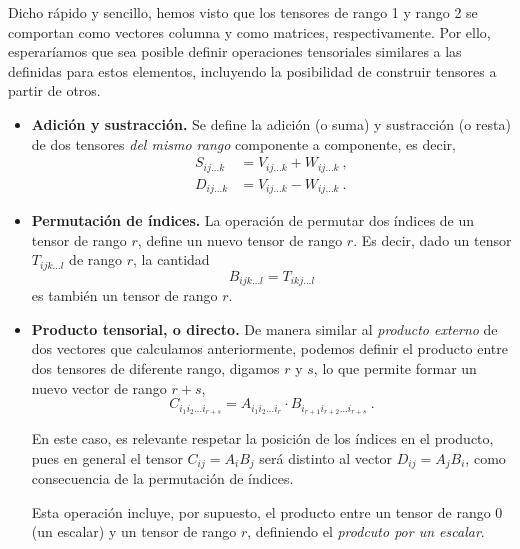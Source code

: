Dicho rápido y sencillo, hemos visto que los tensores de rango 1 y rango 2 se comportan como vectores columna y como matrices, respectivamente. Por ello, esperaríamos que sea posible definir operaciones tensoriales similares a las definidas para estos elementos, incluyendo la posibilidad de construir tensores a partir de otros.

\begin{itemize}
    \item \textbf{Adición y sustracción.} Se define la adición (o suma) y sustracción (o resta) de dos tensores \emph{del mismo rango} componente a componente, es decir,
    \begin{align}
        S_{ij \dots k} & = V_{ij \dots k} + W_{ij \dots k} \ , \\
        D_{ij \dots k} & = V_{ij \dots k} - W_{ij \dots k} \ .
    \end{align}
    \item \textbf{Permutación de índices.} La operación de permutar dos índices de un tensor de rango $r$, define un nuevo tensor de rango $r$. Es decir, dado un tensor $T_{ijk \dots l}$ de rango $r$, la cantidad
    \begin{equation}
        B_{ijk \dots l} = T_{ikj \dots l} 
    \end{equation}
    es también un tensor de rango $r$.

    \item \textbf{Producto tensorial, o directo.} De manera similar al \emph{producto externo} de dos vectores que calculamos anteriormente, podemos definir el producto entre dos tensores de diferente rango, digamos $r$ y $s$, lo que permite formar un nuevo vector de rango $r+s$,
    \begin{equation}
        C_{i_1 i_2 \dots i_{r+s}} = A_{i_1 i_2 \dots i_r} \cdot B_{i_{r+1} i_{r+2} \dots i_{r+s}} \ .
    \end{equation}
    
    En este caso, es relevante respetar la posición de los índices en el producto, pues en general el tensor $C_{ij} = A_i B_j$ será distinto al vector $D_{ij} = A_j B_i$, como consecuencia de la permutación de índices.

    Esta operación incluye, por supuesto, el producto entre un tensor de rango 0 (un escalar) y un tensor de rango $r$, definiendo el \emph{prodcuto por un escalar}.


\end{itemize}
